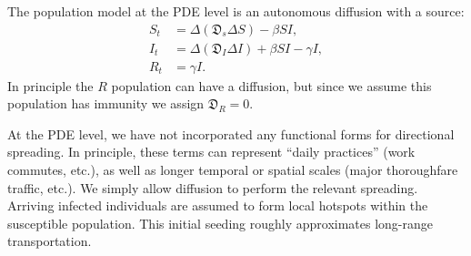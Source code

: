 \documentclass[11pt]{article}
\newcommand{\D}{\mathfrak{D}}
\begin{document}
The population model at the PDE level is an autonomous diffusion with a source:
\begin{align}
	S_t	&=	\Delta (\D_s \Delta S) - \beta SI,	\\
	I_t	&=	\Delta (\D_I \Delta I) + \beta SI - \gamma I,	\\
	R_t	&=	\gamma I.
\end{align}
In principle the $R$ population can have a diffusion, but since we assume this population has immunity we assign $\D_R = 0$.

At the PDE level, we have not incorporated any functional forms for directional spreading.
In principle, these terms can represent ``daily practices'' (work commutes, etc.), as well as longer temporal or spatial scales (major thoroughfare traffic, etc.).
We simply allow diffusion to perform the relevant spreading.
Arriving infected individuals are assumed to form local hotspots within the susceptible population.
This initial seeding roughly approximates long-range transportation.
\end{document}
